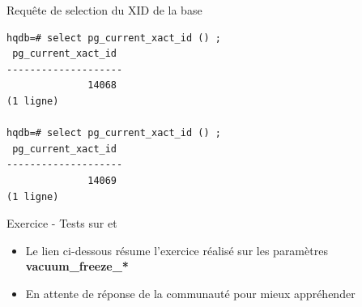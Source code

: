 \begin{frame}[fragile]{Requête de selection du XID de la base}

\begin{tiny}
\begin{Verbatim}[commandchars=\\\{\}]
hqdb=# select pg_current_xact_id () ;
 pg_current_xact_id 
--------------------
              14068
(1 ligne)

hqdb=# select pg_current_xact_id () ;
 pg_current_xact_id 
--------------------
              14069
(1 ligne)
\end{Verbatim}
\end{tiny}

\begin{toile}
\end{toile}

\end{frame}


\begin{frame}[fragile]{Exercice - Tests sur \textbf{} et \textbf{}}

\begin{itemize}
   \item Le lien ci-dessous résume l'exercice réalisé sur les paramètres \textbf{vacuum\_freeze\_*}
   \item En attente de réponse de la communauté pour mieux appréhender
\end{itemize}


\begin{toile}
\end{toile}

\end{frame}



